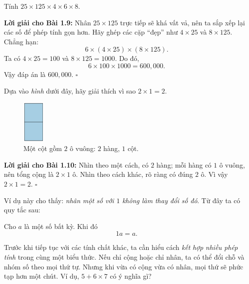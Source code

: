 \begin{problem}[1.9]
Tính \(25 \times 125 \times 4 \times 6 \times 8\).
\end{problem}

\noindent\textbf{Lời giải cho Bài 1.9:}
Nhân \(25\times125\) trực tiếp sẽ khá vất vả, nên ta sắp xếp lại các số
để phép tính gọn hơn. Hãy ghép các cặp “đẹp” như \(4\times25\) và
\(8\times125\). Chẳng hạn:
\[
6 \times (4\times25) \times (8\times125).
\]
Ta có \(4\times25=100\) và \(8\times125=1000\).
Do đó,
\[
6 \times 100 \times 1000 = 600{,}000.
\]
Vậy đáp án là \(\boxed{600{,}000}\). \(\square\)

\begin{problem}[1.10]
Dựa vào \emph{hình} dưới đây, hãy giải thích vì sao \(2\times1=2\).
\begin{figure}[ht!]
  \centering
  \includegraphics[width=0.10\textwidth]{img/fig-prob1.10.pdf}
  \caption*{\small Một cột gồm \(2\) ô vuông: \(2\) hàng, \(1\) cột.}
\end{figure}
\end{problem}

\noindent\textbf{Lời giải cho Bài 1.10:}
Nhìn theo một cách, có \(2\) hàng; mỗi hàng có \(1\) ô vuông, nên tổng cộng
là \(2\times1\) ô. Nhìn theo cách khác, rõ ràng có đúng \(2\) ô. Vì vậy
\(2\times1=2\). \(\square\)

Ví dụ này cho thấy: \emph{nhân một số với \(1\) không làm thay đổi số đó}.
Từ đây ta có quy tắc sau:

\begin{tcolorbox}[colback=yellow!10, colframe=orange!80!black,
title={Quan trọng: Nhân với số \(1\)}]
Cho \(a\) là một số bất kỳ. Khi đó
\[
1a = a.
\]
\end{tcolorbox}

Trước khi tiếp tục với các tính chất khác, ta cần hiểu cách \emph{kết hợp
nhiều phép tính} trong cùng một biểu thức. Nếu chỉ cộng hoặc chỉ nhân,
ta có thể đổi chỗ và nhóm số theo mọi thứ tự. Nhưng khi vừa có cộng vừa
có nhân, mọi thứ sẽ phức tạp hơn một chút. Ví dụ, \(5+6\times7\) có ý
nghĩa gì?

